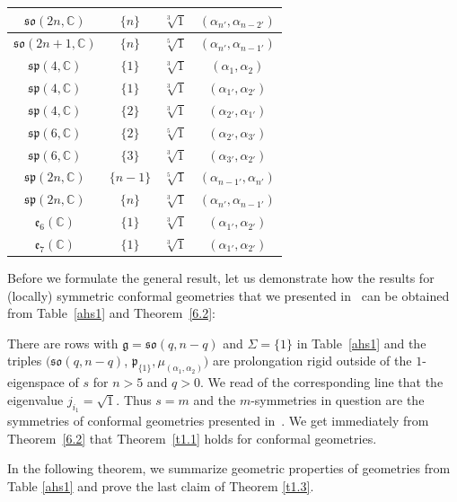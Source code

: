 \documentclass[10pt,a4paper]{amsart}
\newcommand{\fg}{\mathfrak g}
\newcommand{\fp}{\mathfrak p}
\numberwithin{equation}{section}
\begin{document}
\begin{table}[th!]
\begin{tabular}{|c|c|c|c|}
$\mathfrak{so}(2n,\mathbb{C})$ & $\{n\}$& $\sqrt[3]{1}$& $(\alpha_{n'},\alpha_{n-2'})$ \\
\hline
$\mathfrak{so}(2n+1,\mathbb{C})$ & $\{n\}$& $\sqrt[5]{1}$& $(\alpha_{n'},\alpha_{n-1'})$ \\
\hline
$\mathfrak{sp}(4,\mathbb{C})$ & $\{1\}$&$\sqrt[3]{1}$& $(\alpha_{1},\alpha_{2})$\\
\hline
$\mathfrak{sp}(4,\mathbb{C})$ & $\{1\}$&$\sqrt[3]{1}$& $(\alpha_{1'},\alpha_{2'})$\\
\hline
$\mathfrak{sp}(4,\mathbb{C})$ & $\{2\}$&$\sqrt[3]{1}$& $(\alpha_{2'},\alpha_{1'})$\\
\hline
$\mathfrak{sp}(6,\mathbb{C})$ & $\{2\}$&$\sqrt[5]{1}$& $(\alpha_{2'},\alpha_{3'})$\\
\hline
$\mathfrak{sp}(6,\mathbb{C})$ & $\{3\}$&$\sqrt[3]{1}$& $(\alpha_{3'},\alpha_{2'})$\\
\hline
$\mathfrak{sp}(2n,\mathbb{C})$ & $\{n-1\}$&$\sqrt[5]{1}$& $(\alpha_{n-1'},\alpha_{n'})$\\
\hline
$\mathfrak{sp}(2n,\mathbb{C})$ & $\{n\}$&$\sqrt[3]{1}$& $(\alpha_{n'},\alpha_{n-1'})$\\
\hline
$\mathfrak{e}_{6}(\mathbb{C})$ & $\{1\}$&$\sqrt[3]{1}$&$(\alpha_{1'},\alpha_{2'})$\\
\hline
$\mathfrak{e}_{7}(\mathbb{C})$ & $\{1\}$&$\sqrt[3]{1}$&$(\alpha_{1'},\alpha_{2'})$\\
\hline
\end{tabular}
\end{table}

\begin{Example}
Before we formulate the general result, let us demonstrate how the results for (locally) symmetric conformal geometries that we presented in~\cite{GZ4} can be obtained from Table~\ref{ahs1} and Theorem~\ref{6.2}:

There are rows with $\fg=\mathfrak{so}(q,n-q)$ and $\Sigma=\{1\}$ in Table~\ref{ahs1} and the triples $(\mathfrak{so}(q,n-q)$, $\fp_{\{1\}},\mu_{(\alpha_1,\alpha_2)})$ are prolongation rigid outside of the $1$-eigenspace of $s$ for $n>5$ and $q>0$. We read of the corresponding line that the eigenvalue $j_{i_1}=\sqrt{1}$. Thus $s=m$ and the $m$-symmetries in question are the symmetries of conformal geometries presented in~\cite{GZ4}. We get immediately from Theorem~\ref{6.2} that Theorem~\ref{t1.1} holds for conformal geometries.
\end{Example}

In the following theorem, we summarize geometric properties of geometries from Table \ref{ahs1} and prove the last claim of Theorem \ref{t1.3}.
\end{document}
